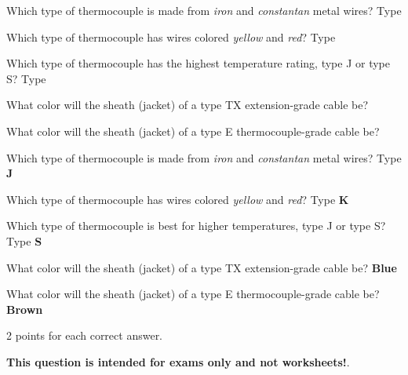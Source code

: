 

Which type of thermocouple is made from {\it iron} and {\it constantan} metal wires?  Type \underbar{\hskip 50pt}

\vskip 10pt

Which type of thermocouple has wires colored {\it yellow} and {\it red}?  Type \underbar{\hskip 50pt}

\vskip 10pt

Which type of thermocouple has the highest temperature rating, type J or type S?  Type \underbar{\hskip 50pt}

\vskip 10pt

What color will the sheath (jacket) of a type TX extension-grade cable be? \underbar{\hskip 50pt}

\vskip 10pt

What color will the sheath (jacket) of a type E thermocouple-grade cable be? \underbar{\hskip 50pt}







Which type of thermocouple is made from {\it iron} and {\it constantan} metal wires?  Type {\bf J}

\vskip 10pt

Which type of thermocouple has wires colored {\it yellow} and {\it red}?  Type {\bf K}

\vskip 10pt

Which type of thermocouple is best for higher temperatures, type J or type S?  Type {\bf S}

\vskip 10pt

What color will the sheath (jacket) of a type TX extension-grade cable be? {\bf Blue}

\vskip 10pt

What color will the sheath (jacket) of a type E thermocouple-grade cable be? {\bf Brown}

\vskip 10pt

2 points for each correct answer.







{\bf This question is intended for exams only and not worksheets!}.




